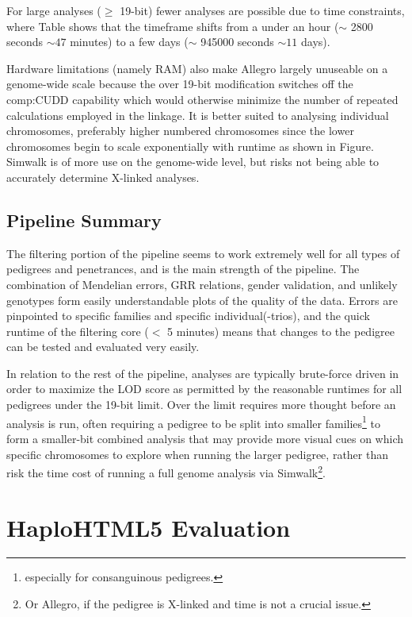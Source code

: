 For large analyses ($\geq$ 19-bit) fewer analyses are possible due to time constraints, where Table shows that the timeframe shifts from a under an hour ($\sim$ 2800 seconds $\sim 47$ minutes) to a few days ($\sim$ 945000 seconds $\sim 11$ days). 

Hardware limitations (namely RAM) also make Allegro largely unuseable on a genome-wide scale because the over 19-bit modification switches off the \gls{comp:CUDD} capability which would otherwise minimize the number of repeated calculations employed in the linkage. It is better suited to analysing individual chromosomes, preferably higher numbered chromosomes since the lower chromosomes begin to scale exponentially with runtime as shown in Figure.  Simwalk is of more use on the genome-wide level, but risks not being able to accurately determine X-linked analyses.


\subsection{Pipeline Summary}

The filtering portion of the pipeline seems to work extremely well for all types of pedigrees and penetrances, and is the main strength of the pipeline. The combination of Mendelian errors, GRR relations, gender validation, and unlikely genotypes form easily understandable plots of the quality of the data. Errors are pinpointed to specific families and specific individual(-trios), and the quick runtime of the filtering core ($<$ 5 minutes) means that changes to the pedigree can be tested and evaluated very easily. 

In relation to the rest of the pipeline, analyses are typically brute-force driven in order to maximize the LOD score as permitted by the reasonable runtimes for all pedigrees under the 19-bit limit. Over the limit requires more thought before an analysis is run, often requiring a pedigree to be split into smaller families\footnote{especially for consanguinous pedigrees.}  to form a smaller-bit combined analysis that may provide more visual cues on which specific chromosomes to explore when running the larger pedigree, rather than risk the time cost of running a full genome analysis via Simwalk\footnote{Or Allegro, if the pedigree is X-linked and time is not a crucial issue.}.


\section{HaploHTML5 Evaluation}

